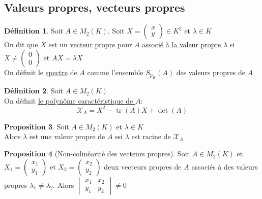 \documentclass[10pt,a4paper]{article}
\theoremstyle{definition}
\newtheorem{proposition}{Proposition}[section]
\newtheorem{definition}[proposition]{Définition}
\DeclareMathOperator{\tr}{tr}
\begin{document}
\subsection{Valeurs propres, vecteurs propres}
\begin{definition}
Soit $A \in M_2(K)$. Soit $X = \begin{pmatrix}
x \\
y
\end{pmatrix} \in K^2$ et $\lambda \in K$ \\
On dit que $X$ est un \uline{vecteur propre} pour $A$ \uline{associé à la valeur propre $\lambda$} si $X \neq \begin{pmatrix}
0 \\
0
\end{pmatrix}$ et $AX = \lambda X$ \\
On définit le \uline{spectre} de $A$ comme l'ensemble $S_{p_K}(A)$ des valeurs propres de $A$
\end{definition}
\begin{definition}
Soit $A \in M_2(K)$ \\
On définit \uline{le polynôme caractéristique de $A$}:
\[ \mathcal{X}_A = X^2 - \tr(A)X + \det(A) \]
\end{definition}
\begin{proposition}
Soit $A \in M_2(K)$ et $\lambda \in K$ \\
Alors $\lambda$ est une valeur propre de $A$ ssi $\lambda$ est racine  de $\mathcal{X}_A$
\end{proposition}
\begin{proposition}[Non-colinéarité des vecteurs propres]
Soit $A \in M_2(K)$ et $X_1 = \begin{pmatrix}
x_1 \\
y_1
\end{pmatrix}$ et $X_2 = \begin{pmatrix}
x_2 \\
y_2
\end{pmatrix}$ deux vecteurs propres de $A$ associés à des valeurs propres $\lambda_1 \neq \lambda_2$. Alors $\begin{vmatrix}
x_1 & x_2 \\
y_1 & y_2
\end{vmatrix} \neq 0$
\end{proposition}
\end{document}
